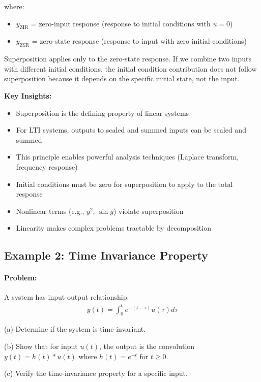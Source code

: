 \documentclass[11pt,a4paper]{article}
\begin{document}
where:
\begin{itemize}
  \item $y_{\text{ZIR}}$ = zero-input response (response to initial conditions with $u = 0$)
  \item $y_{\text{ZSR}}$ = zero-state response (response to input with zero initial conditions)
\end{itemize}

Superposition applies only to the zero-state response. If we combine two inputs with different initial conditions, the initial condition contribution does not follow superposition because it depends on the specific initial state, not the input.

\textbf{Key Insights:}
\begin{itemize}
  \item Superposition is the defining property of linear systems
  \item For LTI systems, outputs to scaled and summed inputs can be scaled and summed
  \item This principle enables powerful analysis techniques (Laplace transform, frequency response)
  \item Initial conditions must be zero for superposition to apply to the total response
  \item Nonlinear terms (e.g., $y^2$, $\sin y$) violate superposition
  \item Linearity makes complex problems tractable by decomposition
\end{itemize}

\subsection{Example 2: Time Invariance Property}

\paragraph{Problem:} A system has input-output relationship:
\begin{align}
  y(t) = \int_0^t e^{-(t-\tau)} u(\tau) d\tau
\end{align}

(a) Determine if the system is time-invariant.

(b) Show that for input $u(t)$, the output is the convolution $y(t) = h(t) * u(t)$ where $h(t) = e^{-t}$ for $t \geq 0$.

(c) Verify the time-invariance property for a specific input.
\end{document}
